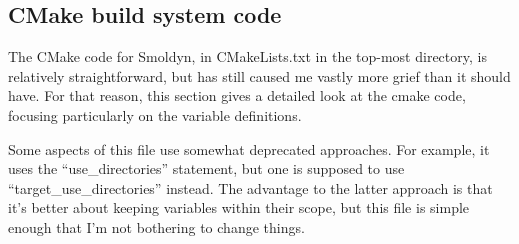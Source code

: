 \documentclass {scrbook}
\begin{document}
\subsection{CMake build system code}

The CMake code for Smoldyn, in CMakeLists.txt in the top-most directory, is relatively straightforward, but has still caused me vastly more grief than it should have. For that reason, this section gives a detailed look at the cmake code, focusing particularly on the variable definitions.

Some aspects of this file use somewhat deprecated approaches. For example, it uses the ``use\_directories'' statement, but one is supposed to use ``target\_use\_directories'' instead. The advantage to the latter approach is that it's better about keeping variables within their scope, but this file is simple enough that I'm not bothering to change things.
\end{document}
